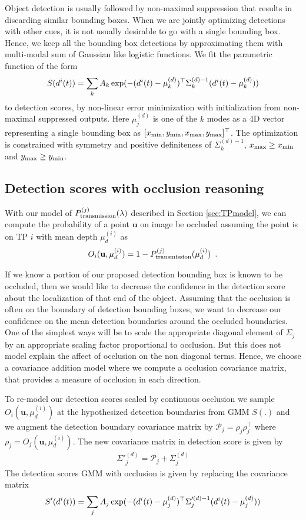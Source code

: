 Object detection is usually followed by non-maximal suppression that results in
discarding similar bounding boxes. When we are jointly optimizing detections
with other cues, it is not usually desirable to go with a single bounding box.
Hence, we keep all the bounding box detections by approximating them with
multi-modal sum of Gaussian like logistic functions. We fit the parametric function of the form 
%
\begin{align}
  S(d^{i}(t)) = \sum_k A_k \exp(-(d^{i}(t)-\mu^{(d)}_k)^\top \Sigma^{(d)-1}_k
  (d^{i}(t)-\mu^{(d)}_k))
\end{align}
%
to detection scores, by non-linear error minimization with initialization from
non-maximal suppressed outputs. Here $\mu^{(d)}_j$ is one of the $k$ modes as a
4D vector representing a single bounding box as $[x_{\text{min}}, y_{\text{min}}, x_{\text{max}},
y_{\text{max}}]^\top$. The optimization is constrained with symmetry and positive
definiteness of $\Sigma^{(d)-1}_k$, $x_{\text{max}} \ge x_{\text{min}}$ and $y_{\text{max}} \ge y_{\text{min}}$.

\subsection{Detection scores with occlusion reasoning} 
With our model of $P^{(j)}_{\text{transmission}}(\lambda)$ described in Section \ref{sec:TPmodel}, we can
compute the probability of a point $\mathbf{u}$ on image be occluded assuming
the point is on TP $i$ with mean depth $\mu^{(i)}_d$ as
\begin{align}
  O_{i}(\mathbf{u}, \mu^{(i)}_d) = 1 - P^{(j)}_{\text{transmission}}(\mu^{(i)}_d) \enspace .
\end{align}

If we know a portion of our proposed detection bounding box is known to be
occluded, then we would like to decrease the confidence in the detection score
about the localization of that end of the object. Assuming that the occlusion
is often on the boundary of detection bounding boxes, we want to decrease our
confidence on the mean detection boundaries around the occluded boundaries.
One of the simplest ways will be to scale the appropriate diagonal element of
$\Sigma_j$ by an appropriate scaling factor proportional to occlusion. But this
does not model explain the affect of occlusion on the non diagonal terms.
Hence, we choose a covariance addition model where we compute a occlusion
covariance matrix, that provides a measure of occlusion in each direction.


To re-model our detection scores scaled by continuous occlusion we sample
$O_{i}(\mathbf{u}, \mu^{(i)}_d)$ at the hypothesized detection boundaries from
GMM $S(.)$ and we augment the detection boundary covariance matrix by
$\mathcal{P}_{j} = \rho_{j}\rho_{j}^\top$ where $\rho_{j} = O_{j}(\mathbf{u},
\mu^{(i)}_d)$. The new covariance matrix in detection score is given by 
%
\begin{align}
  \Sigma'^{(d)}_j = \mathcal{P}_{j} + \Sigma^{(d)}_j
\end{align}
%
The detection scores GMM with occlusion is given by replacing the covariance
matrix
%
\begin{align}
  S'(d^{i}(t)) =
  \sum_j A_j \exp(-(d^{i}(t)-\mu^{(d)}_j)^\top \Sigma'^{(d)-1}_j
  (d^{i}(t)-\mu^{(d)}_j))
\end{align}

